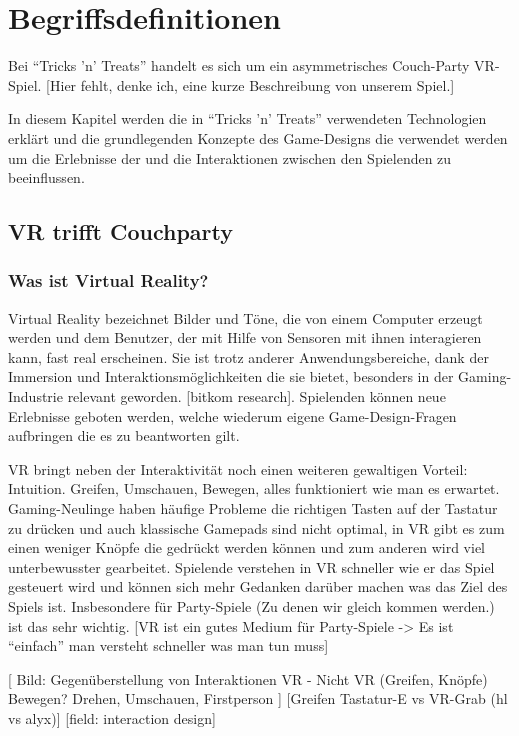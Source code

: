 \chapter{Begriffsdefinitionen}

Bei "`Tricks 'n' Treats"' handelt es sich um ein asymmetrisches Couch-Party VR-Spiel. [Hier fehlt, denke ich, eine kurze Beschreibung von unserem Spiel.]

In diesem Kapitel werden die in "`Tricks 'n' Treats"' verwendeten Technologien erklärt und die grundlegenden Konzepte des Game-Designs die verwendet werden um die  Erlebnisse der und die Interaktionen zwischen den Spielenden zu beeinflussen.

\section{VR trifft Couchparty}

\subsection{Was ist Virtual Reality?}

Virtual Reality bezeichnet Bilder und Töne, die von einem Computer erzeugt werden und dem Benutzer, der mit Hilfe von Sensoren mit ihnen interagieren kann, fast real erscheinen.\cite{_oxford_dict} Sie ist trotz anderer Anwendungsbereiche, dank der Immersion und Interaktionsmöglichkeiten die sie bietet, besonders in der Gaming-Industrie relevant geworden. [bitkom research]. Spielenden können neue Erlebnisse geboten werden, welche wiederum eigene  Game-Design-Fragen aufbringen die es zu beantworten gilt.

VR bringt neben der Interaktivität noch einen weiteren gewaltigen Vorteil: Intuition. Greifen, Umschauen, Bewegen, alles funktioniert wie man es erwartet. Gaming-Neulinge haben häufige Probleme die richtigen Tasten auf der Tastatur zu drücken und auch klassische Gamepads sind nicht optimal, in VR gibt es zum einen weniger Knöpfe die gedrückt werden können und zum anderen wird viel unterbewusster gearbeitet. Spielende verstehen in VR schneller wie er das Spiel gesteuert wird und können sich mehr Gedanken darüber machen was das Ziel des Spiels ist. Insbesondere für Party-Spiele (Zu denen wir gleich kommen werden.) ist das sehr wichtig. [VR ist ein gutes Medium für Party-Spiele -> Es ist "`einfach"' man versteht schneller was man tun muss]

[
Bild: 
	Gegenüberstellung von Interaktionen VR - Nicht VR (Greifen, Knöpfe)
	Bewegen? Drehen, Umschauen, Firstperson
]
[Greifen Tastatur-E vs VR-Grab (hl vs alyx)]
[field: interaction design]

